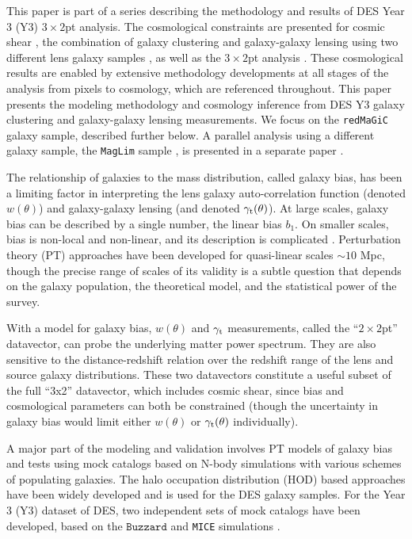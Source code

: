 \documentclass[aps, prd,twocolumn,superscriptaddress,nofootinbib,preprintnumbers]{revtex4-1}
\newcommand{\redmagic}{\texttt{redMaGiC} }
\newcommand{\mice}{\texttt{MICE} }
\newcommand{\maglim}{\texttt{MagLim} }
\newcommand{\buzzard}{\texttt{Buzzard} }
\begin{document}
This paper is part of a series describing the methodology and results of DES Year 3 (Y3) $3\times2$pt analysis. The cosmological constraints are presented for cosmic shear \citep{y3-cosmicshear1,y3-cosmicshear2}, the combination of galaxy clustering and galaxy-galaxy lensing using two different lens galaxy samples \citep[this paper; ][]{y3-2x2ptaltlensresults,y3-2x2ptmagnification}, as well as the $3\times2$pt analysis \citep{y3-3x2ptkp}. These cosmological results are enabled by extensive methodology developments at all stages of the analysis from pixels to cosmology, which are referenced throughout. This paper presents the modeling methodology and cosmology inference from DES Y3 galaxy clustering \citep{y3-galaxyclustering} and galaxy-galaxy lensing \citep{y3-gglensing} measurements. 
We focus on the \redmagic \citep{Rozo_2016} galaxy sample, described further below. A parallel analysis using a different galaxy sample, the \maglim sample \citep{y3-2x2maglimforecast}, is presented in a separate paper \citep{y3-2x2ptaltlensresults}.


The relationship of galaxies to the mass distribution, called galaxy bias, has been a limiting factor in interpreting the lens galaxy auto-correlation function (denoted $w(\theta)$) and galaxy-galaxy lensing (and denoted $\gamma_{\rm t}(\theta)$). At large scales, galaxy bias can be described by a single number, the linear bias $b_1$. On smaller scales, bias is non-local and non-linear, and its description is complicated \citep{Fry_93,Scherrer_98}. Perturbation theory (PT) approaches have been developed for quasi-linear scales $\sim 10$ Mpc, though the precise range of scales of its validity is a subtle question that depends on the galaxy population, the theoretical model, and the statistical power of the survey. 

With a model for galaxy bias, $w(\theta)$ and $\gamma_{\rm t}$ measurements, called the ``$2\times2$pt'' datavector, can probe the underlying matter power spectrum. They are also sensitive to the distance-redshift relation over the redshift range of the lens and source galaxy distributions.  These two datavectors constitute a useful subset of the full ``3x2'' datavector, which includes cosmic shear, since bias and cosmological parameters can both be constrained (though the uncertainty in galaxy bias would limit either $w(\theta)$ or $\gamma_{\rm t}(\theta)$ individually). 


A major part of the modeling and validation involves PT models of galaxy bias and tests using mock catalogs based on N-body simulations with various schemes of populating galaxies. The halo occupation distribution (HOD) based approaches have been widely developed and is used for the DES galaxy samples. For the Year 3 (Y3) dataset of DES, two independent sets of mock catalogs have been developed, based on the $\buzzard$\citep{DeRose2019} and \mice simulations \citep{Fosalba_2014, Crocce_2015, Fosalba_2015}. 
\end{document}
